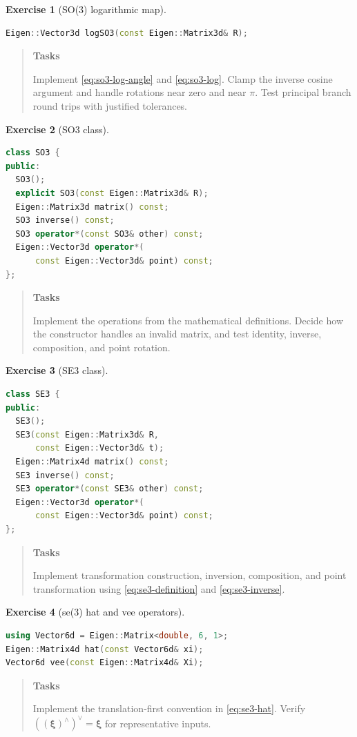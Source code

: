 \documentclass[10pt,a4paper]{article}
\numberwithin{equation}{section}
\newcommand{\vect}[1]{\boldsymbol{#1}}
\theoremstyle{definition}
\theoremstyle{exercisestyle}
\newtheorem{exercise}{Exercise}[section]
\newenvironment{tasks}
    {\par\begin{quote}\small\textbf{Tasks}\par\smallskip}
    {\end{quote}}
\begin{document}
\begin{exercise}[SO(3) logarithmic map]
\begin{lstlisting}[language=C++]
Eigen::Vector3d logSO3(const Eigen::Matrix3d& R);
\end{lstlisting}
\begin{tasks}
Implement \eqref{eq:so3-log-angle} and \eqref{eq:so3-log}. Clamp the inverse
cosine argument and handle rotations near zero and near $\pi$. Test principal
branch round trips with justified tolerances.
\end{tasks}
\end{exercise}

\begin{exercise}[SO3 class]
\begin{lstlisting}[language=C++]
class SO3 {
public:
  SO3();
  explicit SO3(const Eigen::Matrix3d& R);
  Eigen::Matrix3d matrix() const;
  SO3 inverse() const;
  SO3 operator*(const SO3& other) const;
  Eigen::Vector3d operator*(
      const Eigen::Vector3d& point) const;
};
\end{lstlisting}
\begin{tasks}
Implement the operations from the mathematical definitions. Decide how the
constructor handles an invalid matrix, and test identity, inverse, composition,
and point rotation.
\end{tasks}
\end{exercise}

\begin{exercise}[SE3 class]
\begin{lstlisting}[language=C++]
class SE3 {
public:
  SE3();
  SE3(const Eigen::Matrix3d& R,
      const Eigen::Vector3d& t);
  Eigen::Matrix4d matrix() const;
  SE3 inverse() const;
  SE3 operator*(const SE3& other) const;
  Eigen::Vector3d operator*(
      const Eigen::Vector3d& point) const;
};
\end{lstlisting}
\begin{tasks}
Implement transformation construction, inversion, composition, and point
transformation using \eqref{eq:se3-definition} and \eqref{eq:se3-inverse}.
\end{tasks}
\end{exercise}

\begin{exercise}[se(3) hat and vee operators]
\begin{lstlisting}[language=C++]
using Vector6d = Eigen::Matrix<double, 6, 1>;
Eigen::Matrix4d hat(const Vector6d& xi);
Vector6d vee(const Eigen::Matrix4d& Xi);
\end{lstlisting}
\begin{tasks}
Implement the translation-first convention in \eqref{eq:se3-hat}. Verify
$((\vect{\xi})^\wedge)^\vee=\vect{\xi}$ for representative inputs.
\end{tasks}
\end{exercise}
\end{document}

